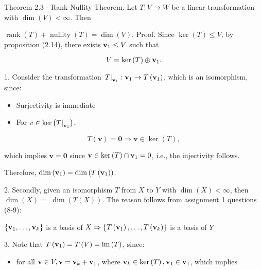 \documentclass[11pt]{article}
\begin{document}
Theorem 2.3 - Rank-Nullity Theorem. Let \(T : V \rightarrow  W\) be a linear transformation with \(\dim \left( V\right)  < \infty\). Then

\(\operatorname{rank}\left( T\right)  + \operatorname{nullity}\left( T\right)  = \dim \left( V\right) .\) Proof. Since \(\ker \left( T\right)  \leq  V\), by proposition (2.14), there exists \({\bf v}_1 \leq  V\) such that

\[
V = \ker \left( T\right)  \oplus  {\bf v}_1.
\]

1. Consider the transformation \({\left. T\right| }_{{\bf v}_1} : {\bf v}_1 \rightarrow  T\left( {\bf v}_1\right)\), which is an isomorphism, since:

\begin{itemize}
\item Surjectivity is immediate
\end{itemize}

\begin{itemize}
\item For \(v \in  \ker \left( {T{ \mid  }_{{\bf v}_1}}\right)\),
\end{itemize}

\[
T\left( \mathbf{v}\right)  = \mathbf{0} \Rightarrow  \mathbf{v} \in  \ker \left( T\right) ,
\]

which implies \(\mathbf{v} = \mathbf{0}\) since \(\mathbf{v} \in  \ker \left( T\right)  \cap  {\bf v}_1 = 0\), i.e., the injectivity follows.

Therefore, \(\dim \left( {\bf v}_1\right)  = \dim \left( {T\left( {\bf v}_1\right) }\right)\).

2. Secondly, given an isomorphism \(T\) from \(X\) to \(Y\) with \(\dim \left( X\right)  < \infty\), then \(\dim \left( X\right)  =\)  \(\dim \left( {T\left( X\right) }\right)\). The reason follows from assignment 1 questions (8-9):

\(\left\{  {{\bf v}_1,\ldots ,{\bf v}_{k}}\right\}\) is a basis of \(X \Rightarrow  \left\{  {T\left( {\bf v}_1\right) ,\ldots ,T\left( {\bf v}_{k}\right) }\right\}\) is a basis of \(Y\)

3. Note that \(T\left( {\bf v}_1\right)  = T\left( V\right)  = \mathrm{{im}}\left( T\right)\), since:

\begin{itemize}
\item for all \(\mathbf{v} \in  V,\mathbf{v} = {\bf v}_{k} + {\bf v}_1\), where \({\bf v}_{k} \in  \ker \left( T\right) ,{\bf v}_1 \in  {\bf v}_1\), which implies
\end{itemize}
\end{document}
